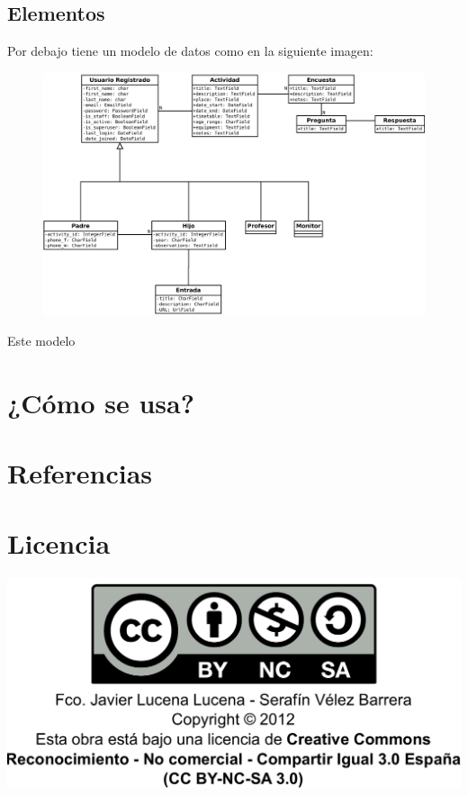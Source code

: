 \documentclass[a4paper,12pt]{article}
\begin{document}
		\subsection{Elementos}
		Por debajo tiene un modelo de datos como en la siguiente imagen:
		\begin{figure}[!ht]
			\begin{center}
				\includegraphics[scale=0.3, keepaspectratio=true]{./Imagenes/Varias/ModeloConceptual.pdf}
			\end{center}
		\end{figure}
		Este modelo 

	\newpage
	
	\section{¿Cómo se usa?} \label{como_se_usa}
	\newpage
	
	\section{Referencias} \label{referencias}
	\newpage


	\section{Licencia}
		\begin{center}
			\href{http://creativecommons.org/licenses/by-nc-sa/3.0/es/}{\includegraphics[scale=0.7, keepaspectratio=true]{./Imagenes/Licencia/licencia.pdf}}
		\end{center}
\end{document}
